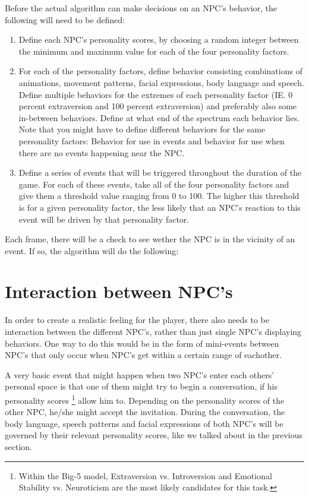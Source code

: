 \documentclass{article}
\begin{document}
    Before the actual algorithm can make decisions on an NPC's behavior, the following will need to be defined:

    \begin{enumerate}
    	\item Define each NPC's personality scores, by choosing a random integer between the minimum and maximum value for each of the four personality factors.
    	\item For each of the personality factors, define behavior consisting combinations of animations, movement patterns, facial expressions, body language and speech. Define multiple behaviors for the extremes of each personality factor (IE. 0 percent extraversion and 100 percent extraversion) and preferably also some in-between behaviors. Define at what end of the spectrum each behavior lies. Note that you might have to define different behaviors for the same personality factors: Behavior for use in events and behavior for use when there are no events happening near the NPC.%
    	\item Define a series of events that will be triggered throughout the duration of the game. For each of these events, take all of the four personality factors and give them a threshold value ranging from 0 to 100. The higher this threshold is for a given personality factor, the less likely that an NPC's reaction to this event will be driven by that personality factor.
    \end{enumerate}

    Each frame, there will be a check to see wether the NPC is in the vicinity of an event. If so, the algorithm will do the following:


	\newpage
	\section{Interaction between NPC's}
	In order to create a realistic feeling for the player, there also needs to be interaction between the different NPC's, rather than just single NPC's displaying behaviors. One way to do this would be in the form of mini-events between NPC's that only occur when NPC's get within a certain range of eachother. 

	A very basic event that might happen when two NPC's enter each others' personal space is that one of them might try to begin a conversation, if his personality scores \footnote{Within the Big-5 model, Extraversion vs. Introversion and Emotional Stability vs. Neuroticism are the most likely candidates for this task.} allow him to. Depending on the personality scores of the other NPC, he/she might accept the invitation. During the conversation, the body language, speech patterns and facial expressions of both NPC's will be governed by their relevant personality scores, like we talked about in the previous section.
\end{document}

